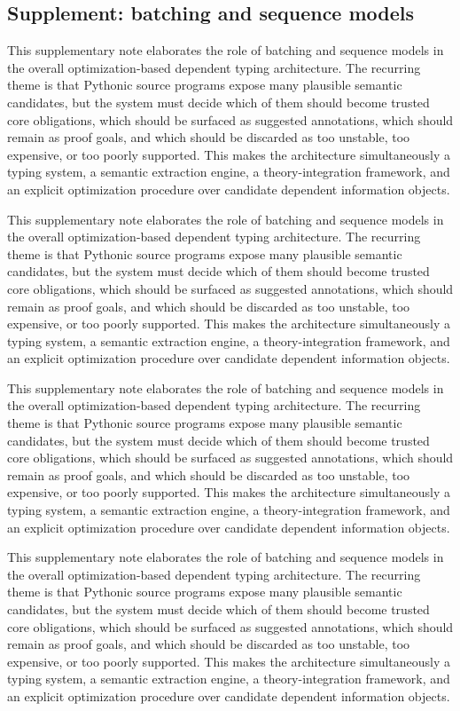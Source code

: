 \documentclass[11pt]{article}
\theoremstyle{definition}
\theoremstyle{plain}
\begin{document}
\subsection{Supplement: batching and sequence models}
This supplementary note elaborates the role of batching and sequence models in the overall
optimization-based dependent typing architecture. The recurring theme is that
Pythonic source programs expose many plausible semantic candidates, but the
system must decide which of them should become trusted core obligations, which
should be surfaced as suggested annotations, which should remain as proof
goals, and which should be discarded as too unstable, too expensive, or too
poorly supported. This makes the architecture simultaneously a typing system,
a semantic extraction engine, a theory-integration framework, and an explicit
optimization procedure over candidate dependent information objects.

This supplementary note elaborates the role of batching and sequence models in the overall
optimization-based dependent typing architecture. The recurring theme is that
Pythonic source programs expose many plausible semantic candidates, but the
system must decide which of them should become trusted core obligations, which
should be surfaced as suggested annotations, which should remain as proof
goals, and which should be discarded as too unstable, too expensive, or too
poorly supported. This makes the architecture simultaneously a typing system,
a semantic extraction engine, a theory-integration framework, and an explicit
optimization procedure over candidate dependent information objects.

This supplementary note elaborates the role of batching and sequence models in the overall
optimization-based dependent typing architecture. The recurring theme is that
Pythonic source programs expose many plausible semantic candidates, but the
system must decide which of them should become trusted core obligations, which
should be surfaced as suggested annotations, which should remain as proof
goals, and which should be discarded as too unstable, too expensive, or too
poorly supported. This makes the architecture simultaneously a typing system,
a semantic extraction engine, a theory-integration framework, and an explicit
optimization procedure over candidate dependent information objects.

This supplementary note elaborates the role of batching and sequence models in the overall
optimization-based dependent typing architecture. The recurring theme is that
Pythonic source programs expose many plausible semantic candidates, but the
system must decide which of them should become trusted core obligations, which
should be surfaced as suggested annotations, which should remain as proof
goals, and which should be discarded as too unstable, too expensive, or too
poorly supported. This makes the architecture simultaneously a typing system,
a semantic extraction engine, a theory-integration framework, and an explicit
optimization procedure over candidate dependent information objects.
\end{document}
